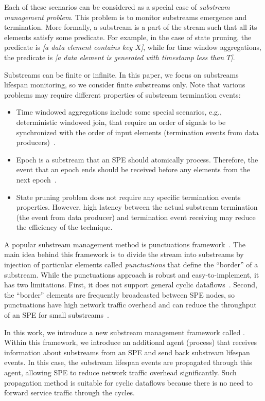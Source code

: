 Each of these scenarios can be considered as a special case of {\em substream management problem}. This problem is to monitor substreams emergence and termination. More formally, a substream is a part of the stream such that all its elements satisfy some predicate. For example, in the case of state pruning, the predicate is {\em [a data element contains key $X$]}, while for time window aggregations, the predicate is {\em [a data element is generated with timestamp less than $T$]}. 

Substreams can be finite or infinite. In this paper, we focus on substreams lifespan monitoring, so we consider finite substreams only. Note that various problems may require different properties of substream termination events:
\begin{itemize}
    \item Time windowed aggregations include some special scenarios, e.g., deterministic windowed join, that require an order of signals to be synchronized with the order of input elements (termination events from data producers)~\cite{najdataei2019stretch, gulisano2016scalejoin}.
    \item Epoch is a substream that an SPE should atomically process. Therefore, the event that an epoch ends should be received before any elements from the next epoch~\cite{2015arXiv150608603C}. 
    \item State pruning problem does not require any specific termination events properties. However, high latency between the actual substream termination (the event from data producer) and termination event receiving may reduce the efficiency of the technique.
\end{itemize}

A popular substream management method is punctuations framework~\cite{tucker2003exploiting}. The main idea behind this framework is to divide the stream into substreams by injection of particular elements called {\em punctuations} that define the ``border'' of a substream. While the punctuations approach is robust and easy-to-implement, it has two limitations. First, it does not support general cyclic dataflows~\cite{carbone2018scalable}. Second, the ``border'' elements are frequently broadcasted between SPE nodes, so punctuations have high network traffic overhead and can reduce the throughput of an SPE for small substreams~\cite{Li:2008:OPN:1453856.1453890}. 

In this work, we introduce a new substream management framework called \tracker. Within this framework, we introduce an additional agent (process) that receives information about substreams from an SPE and send back substream lifespan events. In this case, the substream lifespan events are propagated through this agent, allowing SPE to reduce network traffic overhead significantly. Such propagation method is suitable for cyclic dataflows because there is no need to forward service traffic through the cycles.

